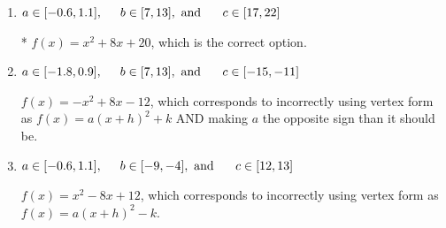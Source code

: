 \documentclass{extbook}[14pt]
\begin{document}
\begin{enumerate}
{\begin{enumerate}[label=\Alph*.]
$f(x)=x^{2} -8 x + 20$, which corresponds to incorrectly using vertex form as $f(x) = a(x+h)^2+k$.
\item \( a \in [-0.6, 1.1], \hspace*{5mm} b \in [7, 13], \text{ and } \hspace*{5mm} c \in [17, 22] \)

* $f(x)=x^{2} +8 x + 20$, which is the correct option.
\item \( a \in [-1.8, 0.9], \hspace*{5mm} b \in [7, 13], \text{ and } \hspace*{5mm} c \in [-15, -11] \)

$f(x)=-x^{2} +8 x -12$, which corresponds to incorrectly using vertex form as $f(x) = a(x+h)^2+k$ AND making $a$ the opposite sign than it should be.
\item \( a \in [-0.6, 1.1], \hspace*{5mm} b \in [-9, -4], \text{ and } \hspace*{5mm} c \in [12, 13] \)

$f(x)=x^{2} -8 x + 12$, which corresponds to incorrectly using vertex form as $f(x) = a(x+h)^2 - k$.
\end{enumerate}

}
\end{enumerate}
\end{document}
